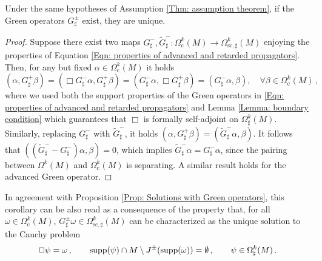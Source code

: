 \begin{corollary}\label{Cor: uniqueness}
	Under the same hypotheses of Assumption \ref{Thm: assumption theorem}, if the Green operators $G^\pm_\sharp$ exist, they are unique.
\end{corollary}

\begin{proof}
	Suppose there exist two maps $G^-_\sharp,\widetilde{G}^-_\sharp\colon\Omega_{\mathrm{c}}^k(M)\to\Omega_{\mathrm{sc},\sharp}^k(M)$ enjoying the properties of Equation \eqref{Eqn: properties of advanced and retarded propagators}. Then, for any but fixed $\alpha\in\Omega^k_{\mathrm{c}}(M)$ it holds
	$$(\alpha,G^+_\sharp\beta)=(\Box G^-_\sharp\alpha,G^+_\sharp\beta)=(G^-_\sharp\alpha,\Box G^+_\sharp\beta)=(G^-_\sharp\alpha,\beta),\quad\forall\beta\in\Omega^k_{\mathrm{c}}(M)\,,$$
	where we used both the support properties of the Green operators in \eqref{Eqn: properties of advanced and retarded propagators} and Lemma \ref{Lemma: boundary condition} which guarantees that $\Box$ is formally self-adjoint on $\Omega^k_\sharp(M)$.
	Similarly, replacing $G^-_\sharp$ with $\widetilde{G}^-_\sharp$, it holds $(\alpha,G^+_{\sharp}\beta)=(\widetilde{G}^-_\sharp\alpha,\beta)$.
	It follows that $((\widetilde{G}^-_\sharp-G^-_\sharp)\alpha,\beta)=0$, which implies $\widetilde{G}^-_\sharp\alpha=G^-_\sharp\alpha$, since the pairing between $\Omega^k(M)$ and $\Omega^k_{\mathrm{c}}(M)$ is separating.
	A similar result holds for the advanced Green operator.
\end{proof}

\noindent In agreement with Proposition \ref{Prop: Solutions with Green operators}, this corollary can be also read as a consequence of the property that, for all $\omega\in\Omega^k_{\mathrm{c}}(M)$,
$G^\pm_\sharp\omega\in\Omega_{\mathrm{sc},\sharp}^k(M)$ can be characterized as the unique solution to the Cauchy problem
\begin{align}\label{Eqn: Cauchy problem for propagators with boundary conditions}
\Box\psi=\omega\,,\qquad
{\rm supp}(\psi)\cap M\setminus J^\pm({\rm supp}(\omega))=\emptyset\,,\qquad
\psi\in\Omega^k_\sharp(M)\,.
\end{align}

